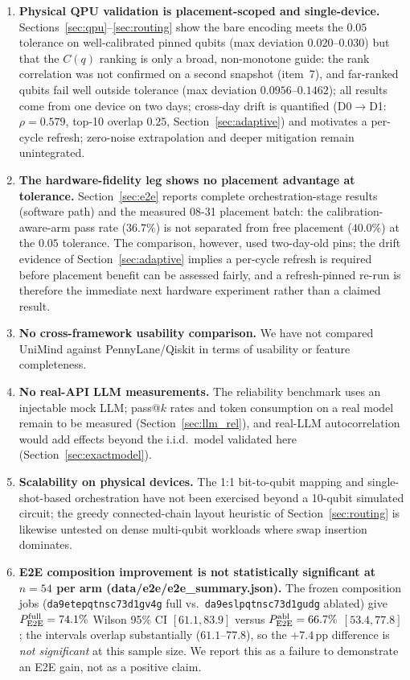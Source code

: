 ﻿\documentclass[12pt,a4paper]{article}
\begin{document}
\begin{enumerate}[leftmargin=2em]
    \item \textbf{Physical QPU validation is placement-scoped and single-device.} Sections~\ref{sec:qpu}--\ref{sec:routing} show the bare encoding meets the $0.05$ tolerance on well-calibrated pinned qubits (max deviation $0.020$--$0.030$) but that the $C(q)$ ranking is only a broad, non-monotone guide: the rank correlation was not confirmed on a second snapshot (item~7), and far-ranked qubits fail well outside tolerance (max deviation $0.0956$--$0.1462$); all results come from one device on two days; cross-day drift is quantified (D0$\to$D1: $\rho{=}0.579$, top-10 overlap $0.25$, Section~\ref{sec:adaptive}) and motivates a per-cycle refresh; zero-noise extrapolation and deeper mitigation remain unintegrated.
    \item \textbf{The hardware-fidelity leg shows no placement advantage at tolerance.} Section~\ref{sec:e2e} reports complete orchestration-stage results (software path) and the measured 08-31 placement batch: the calibration-aware-arm pass rate ($36.7\%$) is not separated from free placement ($40.0\%$) at the $0.05$ tolerance. The comparison, however, used two-day-old pins; the drift evidence of Section~\ref{sec:adaptive} implies a per-cycle refresh is required before placement benefit can be assessed fairly, and a refresh-pinned re-run is therefore the immediate next hardware experiment rather than a claimed result.
    \item \textbf{No cross-framework usability comparison.} We have not compared UniMind against PennyLane/Qiskit in terms of usability or feature completeness.
    \item \textbf{No real-API LLM measurements.} The reliability benchmark uses an injectable mock LLM; pass@$k$ rates and token consumption on a real model remain to be measured (Section~\ref{sec:llm_rel}), and real-LLM autocorrelation would add effects beyond the i.i.d.\ model validated here (Section~\ref{sec:exactmodel}).
    \item \textbf{Scalability on physical devices.} The 1:1 bit-to-qubit mapping and single-shot-based orchestration have not been exercised beyond a 10-qubit simulated circuit; the greedy connected-chain layout heuristic of Section~\ref{sec:routing} is likewise untested on dense multi-qubit workloads where swap insertion dominates.
    \item \textbf{E2E composition improvement is not statistically significant at $n{=}54$ per arm (data/e2e/e2e\_summary.json).} The frozen composition jobs (\texttt{da9etepqtnsc73d1gv4g} full vs.\ \texttt{da9eslpqtnsc73d1gudg} ablated) give $P_{\rm E2E}^{\rm full}=74.1\%$ Wilson 95\% CI $[61.1,83.9]$ versus $P_{\rm E2E}^{\rm abl}=66.7\%$ $[53.4,77.8]$; the intervals overlap substantially ($61.1$--$77.8$), so the $+7.4$\,pp difference is \emph{not significant} at this sample size. We report this as a failure to demonstrate an E2E gain, not as a positive claim.

\end{enumerate}
\end{document}
